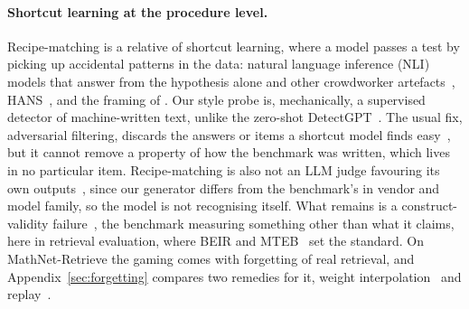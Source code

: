 \paragraph{Shortcut learning at the procedure level.}
Recipe-matching is a relative of shortcut learning, where a model passes a test by picking up accidental patterns in the data: natural language inference (NLI) models that answer from the hypothesis alone and other crowdworker artefacts~\citep{gururangan2018artifacts,poliak2018hypothesis}, HANS~\citep{mccoy2019hans}, and the framing of \citet{geirhos2020shortcut}. Our style probe is, mechanically, a supervised detector of machine-written text, unlike the zero-shot DetectGPT~\citep{mitchell2023detectgpt}. The usual fix, adversarial filtering, discards the answers or items a shortcut model finds easy~\citep{zellers2019hellaswag,lebras2020aflite}, but it cannot remove a property of how the benchmark was written, which lives in no particular item. Recipe-matching is also not an LLM judge favouring its own outputs~\citep{panickssery2024selfpref,zheng2023judging}, since our generator differs from the benchmark's in vendor and model family, so the model is not recognising itself. What remains is a construct-validity failure~\citep{raji2021everything,bowman2021fixbench}, the benchmark measuring something other than what it claims, here in retrieval evaluation, where BEIR and MTEB~\citep{thakur2021beir,muennighoff2023mteb} set the standard. On MathNet-Retrieve the gaming comes with forgetting of real retrieval, and Appendix~\ref{sec:forgetting} compares two remedies for it, weight interpolation~\citep{wortsman2022wiseft} and replay~\citep{chaudhry2019tiny}.
